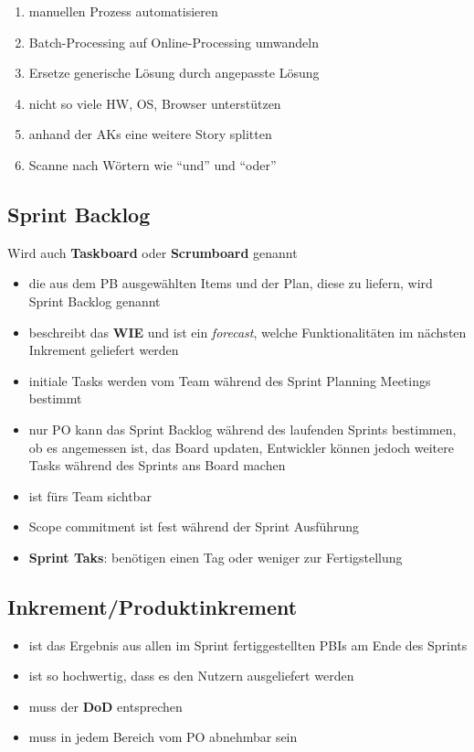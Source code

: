 \begin{itemize}
\begin{enumerate}
    \item manuellen Prozess automatisieren
    \item Batch-Processing auf Online-Processing umwandeln
    \item Ersetze generische Lösung durch angepasste Lösung
    \item nicht so viele HW, OS, Browser unterstützen
    \item anhand der AKs eine weitere Story splitten
    \item Scanne nach Wörtern wie \enquote{und} und \enquote{oder}
  \end{enumerate}
\end{itemize}


\subsection{Sprint Backlog}
Wird auch \textbf{Taskboard} oder \textbf{Scrumboard} genannt


\begin{itemize}
  \item die aus dem PB ausgewählten Items und der Plan, diese zu liefern, wird Sprint Backlog genannt
  \item beschreibt das \textbf{WIE} und ist ein \textit{forecast}, welche Funktionalitäten
    im nächsten Inkrement geliefert werden
  \item initiale Tasks werden vom Team während des Sprint Planning Meetings bestimmt
  \item nur PO kann das Sprint Backlog während des laufenden Sprints bestimmen, ob es angemessen
    ist, das Board updaten, Entwickler können jedoch weitere Tasks während des Sprints ans Board
    machen
  \item ist fürs Team sichtbar
  \item Scope commitment ist fest während der Sprint Ausführung
  \item \textbf{Sprint Taks}: benötigen einen Tag oder weniger zur Fertigstellung
\end{itemize}


\subsection{Inkrement/Produktinkrement}
\begin{itemize}
  \item ist das Ergebnis aus allen im Sprint fertiggestellten PBIs am Ende des Sprints
  \item ist so hochwertig, dass es den Nutzern ausgeliefert werden
  \item muss der \textbf{DoD} entsprechen
  \item muss in jedem Bereich vom PO abnehmbar sein
\end{itemize}


